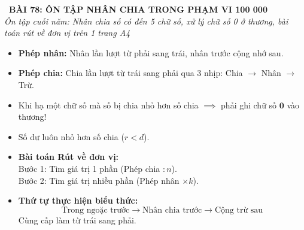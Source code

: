 \documentclass[11pt,a4paper]{article}
\begin{document}
\begin{tcolorbox}[
  enhanced,
  colback=white,
  colframe=primary,
  arc=3mm,
  boxrule=1.2pt,
  left=4mm, right=4mm, top=2.5mm, bottom=2.5mm,
  drop shadow=black!10!white
]
  \centering
  {\Large\bfseries\color{primary}\faBookmark\ BÀI 78: ÔN TẬP NHÂN CHIA TRONG PHẠM VI 100 000}\\[1.5mm]
  {\small\itshape\color{black!75}Ôn tập cuối năm: Nhân chia số có đến 5 chữ số, xử lý chữ số 0 ở thương, bài toán rút về đơn vị trên 1 trang A4}
\end{tcolorbox}

\vspace{-2mm}


\noindent
\begin{minipage}[t]{0.49\textwidth}\vspace{0pt}
\begin{tcolorbox}[
  enhanced,
  colback=blue!4!white,
  colframe=blue!75!black,
  arc=2mm, boxrule=0.8pt,
  left=2mm, right=2mm, top=1.8mm, bottom=1.8mm,
  title={\footnotesize\bfseries\color{white}\faCalculator\ 1. Quy tắc Nhân và Chia cốt lõi}
]
{\footnotesize
\begin{itemize}\setlength{\itemsep}{1.5pt}\setlength{\leftskip}{-2.5mm}
  \item \textbf{Phép nhân:} Nhân lần lượt từ phải sang trái, nhân trước cộng nhớ sau.
  \item \textbf{Phép chia:} Chia lần lượt từ trái sang phải qua 3 nhịp: Chia $\to$ Nhân $\to$ Trừ.
  \item Khi hạ một chữ số mà số bị chia nhỏ hơn số chia $\implies$ phải ghi chữ số $\mathbf{0}$ vào thương!
  \item Số dư luôn nhỏ hơn số chia ($r < d$).
\end{itemize}
}
\end{tcolorbox}
\end{minipage}
\hfill
\begin{minipage}[t]{0.49\textwidth}\vspace{0pt}
\begin{tcolorbox}[
  enhanced,
  colback=teal!4!white,
  colframe=teal!75!black,
  arc=2mm, boxrule=0.8pt,
  left=2mm, right=2mm, top=1.8mm, bottom=1.8mm,
  title={\footnotesize\bfseries\color{white}\faSliders\ 2. Bài toán Rút về đơn vị và Thứ tự tính}
]
{\footnotesize
\begin{itemize}\setlength{\itemsep}{1.5pt}\setlength{\leftskip}{-2.5mm}
  \item \textbf{Bài toán Rút về đơn vị:}\\
  Bước 1: Tìm giá trị 1 phần (Phép chia $: n$).\\
  Bước 2: Tìm giá trị nhiều phần (Phép nhân $\times k$).
  \item \textbf{Thứ tự thực hiện biểu thức:}
  $$\text{Trong ngoặc trước} \to \text{Nhân chia trước} \to \text{Cộng trừ sau}$$
  Cùng cấp làm từ trái sang phải.
\end{itemize}
}
\end{tcolorbox}
\end{minipage}
\end{document}
